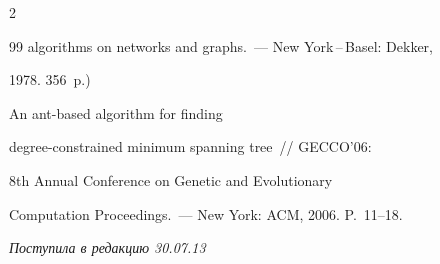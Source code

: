 \begin{multicols}{2}
{{\begin{thebibliography}{99}
algorithms on networks and graphs.~--- New York\,--\,Basel: Dekker,


1978. 356~p.)







 An ant-based algorithm for finding


degree-constrained minimum spanning tree~// \mbox{GECCO'06}:


8th Annual Conference on Genetic and Evolutionary


Computation Proceedings.~--- New York: ACM, 2006. P.~11--18.





\end{thebibliography}


} }





\end{multicols}





\vspace*{-6pt}





\hfill{\small\textit{Поступила в редакцию 30.07.13}}





\newpage































\def\tit{ON POLYNOMIAL TIME COMPLEXITY OF~ULTRAMETRIC VERSIONS OF~CERTAIN NP-HARD PROBLEMS}





